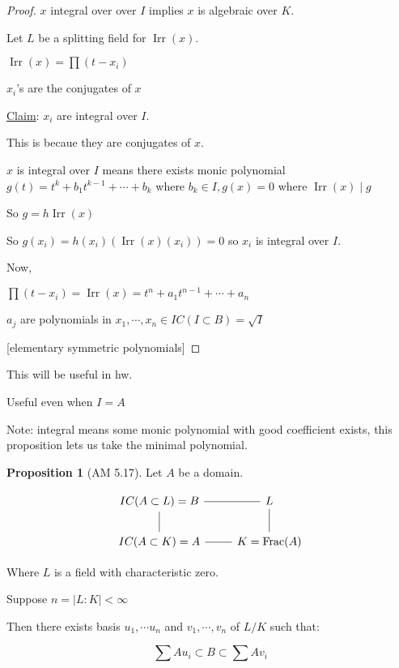 \documentclass{article}
\theoremstyle{definition}
\newtheorem{proposition}{Proposition}
\newcommand{\Frac}{\operatorname{Frac}}
\begin{document}
\begin{proof}
    \(x\) integral over over \(I\) implies \(x\) is algebraic over \(K\).

    Let \(L\) be a splitting field for \(\operatorname{Irr}(x) \).
    
    \(\operatorname{Ir r}(x) = \prod (t - x_i)\)
    
    \(x_i\)'s are the conjugates of \(x\) 

    \underline{Claim}: \(x_i\) are integral over \(I\).

    This is becaue they are conjugates of \(x\).

    \(x\) is integral over \(I\) means there exists monic polynomial \(g(t)=t^k + b_1 t^{k-1} + \cdots + b_k \) where \(b_k \in I, g(x)=0\) where \(\operatorname{Ir r}(x) \mid g\)
    
    So \(g = h \operatorname{Ir r}(x) \) 

    So \(g(x_i) = h(x_i)(\operatorname{Irr}(x)(x_i))=0\) so \(x_i\) is integral over \(I\).
    
    Now,

    \(\prod (t -x_i) = \operatorname{Ir r}(x) = t^n + a_1 t^{n-1} + \cdots + a_n \)
    
    \(a_j\) are polynomials in \(x_1,\cdots, x_n\in IC(I \subset B)= \sqrt{I}\)

    [elementary symmetric polynomials]

\end{proof}

This will be useful in hw.

Useful even when \(I = A\)

Note: integral means some monic polynomial with good coefficient exists, this proposition lets us take the minimal polynomial.

\begin{proposition}
    [AM 5.17]

    Let \(A\) be a domain.
    
    \[
        \begin{tikzcd}
            IC(A \subset L) = B \ar[r, no head] & L \\
            IC(A \subset K) = A \ar[u, no head] \ar[r, no head] & K = \Frac(A) \ar[u, no head]
        \end{tikzcd}
    \]

    Where \(L\) is a field with characteristic zero.

    Suppose \(n = \vert L : K \vert < \infty\) 

    Then there exists basis \(u_1,\cdots u_n\) and \(v_1,\cdots, v_n\) of \(L / K\) such that:

    \[
        \sum Au_i \subset B \subset \sum A v_i
    \]
\end{proposition}
\end{document}
